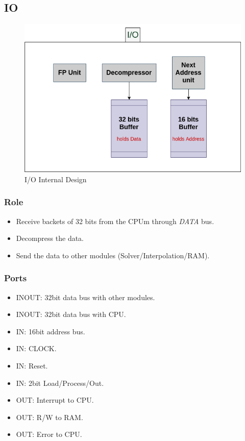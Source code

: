 \documentclass[12pt]{report}
\begin{document}
\subsection{IO}

\begin{figure}[hp]
    \centering
    \includegraphics[width=\textwidth]{IO}
    \caption{I/O Internal Design}
    \label{fig:io}
\end{figure}

\subsubsection{Role}
\begin{itemize}
    \item Receive backets of 32 bits from the CPUm through \emph{DATA} bus.
    \item Decompress the data.
    \item Send the data to other modules (Solver/Interpolation/RAM).
\end{itemize}

\subsubsection{Ports}
\begin{itemize}
    \item INOUT: 32bit data bus with other modules.
    \item INOUT: 32bit data bus with CPU.
    \item IN: 16bit address bus.
    \item IN: CLOCK.
    \item IN: Reset.
    \item IN: 2bit Load/Process/Out.
    \item OUT: Interrupt to CPU.
    \item OUT: R/W to RAM.
    \item OUT: Error to CPU.
\end{itemize}
\end{document}
